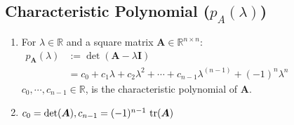 \subsection{Characteristic Polynomial ($p_A(\lambda)$)}

\begin{enumerate}
    \item 
    \begin{definition}
        For $\lambda \in \mathbb{R}$ and a square matrix $\bm{A} \in \mathbb{R}^{n\times n}$:
        \\
        $
            \begin{aligned}
                p_{\bm{A}}(\lambda ) &:= \det(\bm{A} - \lambda \bm{I}) \\
                &= c_0 + c_1\lambda  + c_2\lambda  ^2 + \cdots + c_{n-1}\lambda ^{( n-1)} + (-1)^n\lambda^  n
            \end{aligned}
        $
        \\
        $c_0, \cdots , c_{n-1} \in \mathbb{R}$, is the characteristic polynomial of $\bm{A}$.
    \end{definition}

    \item $c_0 = \det(\bm{A}), c_{n-1} = (-1)^{n-1}\ \text{tr}(\bm{A})$
\end{enumerate}









